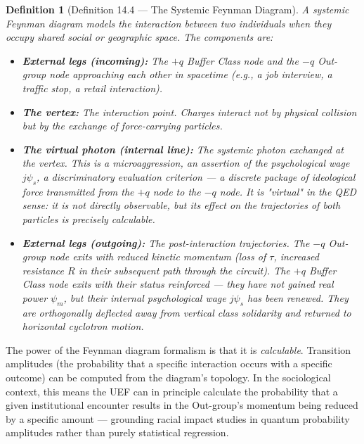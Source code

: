 \documentclass[12pt]{book}
\numberwithin{equation}{chapter}
\newtheorem{definition}{Definition}[chapter]
\begin{document}
\begin{definition}[Definition 14.4 — The Systemic Feynman Diagram]
A systemic Feynman diagram models the interaction between two individuals when they occupy shared social or geographic space. The components are:
    
\begin{itemize}

\item \textbf{External legs (incoming):} The $+q$ Buffer Class node and the $-q$ Out-group node approaching each other in spacetime (e.g., a job interview, a traffic stop, a retail interaction).

\item \textbf{The vertex:} The interaction point. Charges interact not by physical collision but by the exchange of force-carrying particles.

\item \textbf{The virtual photon (internal line):} The systemic photon exchanged at the vertex. This is a microaggression, an assertion of the psychological wage $j\psi_s$, a discriminatory evaluation criterion — a discrete package of ideological force transmitted from the $+q$ node to the $-q$ node. It is "virtual" in the QED sense: it is not directly observable, but its effect on the trajectories of both particles is precisely calculable.

\item \textbf{External legs (outgoing):} The post-interaction trajectories. The $-q$ Out-group node exits with reduced kinetic momentum (loss of $\tau$, increased resistance $R$ in their subsequent path through the circuit). The $+q$ Buffer Class node exits with their status reinforced — they have not gained real power $\psi_m$, but their internal psychological wage $j\psi_s$ has been renewed. They are orthogonally deflected away from vertical class solidarity and returned to horizontal cyclotron motion.

\end{itemize}

\end{definition}

    The power of the Feynman diagram formalism is that it is \emph{calculable}. Transition amplitudes (the probability that a specific interaction occurs with a specific outcome) can be computed from the diagram's topology. In the sociological context, this means the UEF can in principle calculate the probability that a given institutional encounter results in the Out-group's momentum being reduced by a specific amount — grounding racial impact studies in quantum probability amplitudes rather than purely statistical regression.
  
\end{document}
